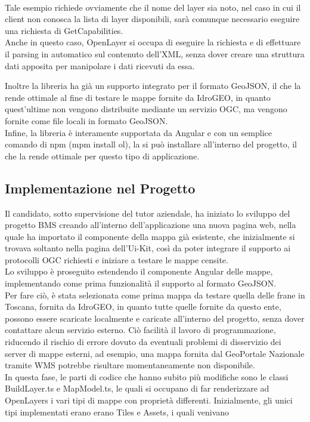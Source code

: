 \\Tale esempio richiede ovviamente che il nome del layer sia noto, nel caso in cui il client non conosca la lista di layer disponibili, sarà comunque necessario eseguire una richiesta di GetCapabilities.
\\Anche in questo caso, OpenLayer si occupa di eseguire la richiesta e di effettuare il parsing in automatico sul contenuto dell'XML, senza dover creare una struttura dati apposita per manipolare i dati ricevuti da essa.

Inoltre la libreria ha già un supporto integrato per il formato GeoJSON, il che la rende ottimale al fine di testare le mappe fornite da IdroGEO, in quanto quest'ultime non vengono distribuite mediante un servizio OGC, ma vengono fornite come file locali in formato GeoJSON.
\\Infine, la libreria è interamente supportata da Angular e con un semplice comando di npm (mpm install ol), la si può installare all'interno del progetto, il che la rende ottimale per questo tipo di applicazione.


\subsection{Implementazione nel Progetto}

Il candidato, sotto supervisione del tutor aziendale, ha iniziato lo sviluppo del progetto BMS creando all'interno dell'applicazione una nuova pagina web, nella quale ha importato il componente della mappa già esistente, che inizialmente si trovava soltanto nella pagina dell'Ui-Kit, così da poter integrare il supporto ai protocolli OGC richiesti e iniziare a testare le mappe censite.
\\Lo sviluppo è proseguito estendendo il componente Angular delle mappe, implementando come prima funzionalità il supporto al formato GeoJSON.
\\Per fare ciò, è stata selezionata come prima mappa da testare quella delle frane in Toscana, fornita da IdroGEO, in quanto tutte quelle fornite da questo ente, possono essere scaricate localmente e caricate all'interno del progetto, senza dover contattare alcun servizio esterno. Ciò facilità il lavoro di programmazione, riducendo il rischio di errore dovuto da eventuali problemi di disservizio dei server di mappe esterni, ad esempio, una mappa fornita dal GeoPortale Nazionale tramite WMS potrebbe risultare momentaneamente non disponibile.
\\In questa fase, le parti di codice che hanno subito più modifiche sono le classi BuildLayer.ts e MapModel.ts, le quali si occupano di far renderizzare ad OpenLayers i vari tipi di mappe con proprietà differenti. Inizialmente, gli unici tipi implementati erano erano Tiles e Assets, i quali venivano


